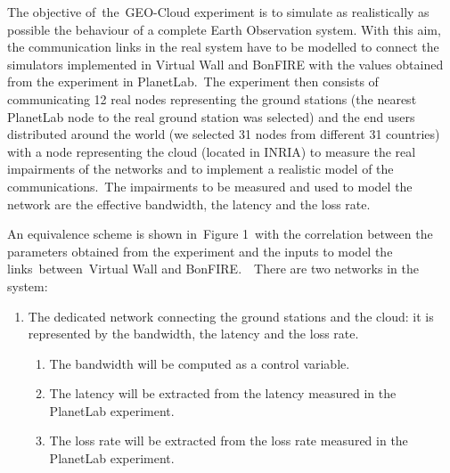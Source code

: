 \documentclass[a4paper]{article}
\newcounter{saveenum}
\newcommand\liststyleLFOvi{%
\renewcommand\theenumi{\roman{enumi}}
\renewcommand\theenumii{\alph{enumii}}
\renewcommand\theenumiii{\roman{enumiii}}
\renewcommand\theenumiv{\arabic{enumiv}}
\renewcommand\labelenumi{\theenumi)}
\renewcommand\labelenumii{\theenumii.}
\renewcommand\labelenumiii{\theenumiii.}
\renewcommand\labelenumiv{\theenumiv.}
}
\begin{document}
The objective of\ the\ GEO-Cloud experiment is to simulate as
realistically as possible the behaviour of a complete Earth Observation
system. With this aim, the communication links in the real system have
to be modelled to connect the simulators implemented in Virtual Wall
and BonFIRE with the values obtained from the experiment in
PlanetLab.\ The experiment then consists of communicating 12 real nodes
representing the ground stations (the nearest PlanetLab node to the
real ground station was selected) and the end users distributed around
the world (we selected 31 nodes from different 31 countries) with a
node representing the cloud (located in INRIA) to measure the real
impairments of the networks and to implement a realistic model of the
communications.\ The impairments to be measured and used to model the
network are the effective bandwidth, the latency and the loss rate.

An equivalence scheme is shown in\ Figure 1\ with the correlation
between the parameters obtained from the experiment and the inputs to
model the links\ between\ Virtual Wall and BonFIRE.\ \ There are two
networks in the system:\ 

\liststyleLFOvi
\setcounter{saveenum}{\value{enumi}}
\begin{enumerate}
\setcounter{enumi}{\value{saveenum}}
\item The dedicated network connecting the ground stations and the
cloud: it is represented by the bandwidth, the latency and the loss
rate.\ 

\setcounter{saveenum}{\value{enumii}}
\begin{enumerate}
\setcounter{enumii}{\value{saveenum}}
\item The bandwidth will be computed as a control variable.
\item The latency will be extracted from the latency measured in the
PlanetLab experiment.
\item The loss rate will be extracted from the loss rate measured in the
PlanetLab experiment.
\end{enumerate}
\end{enumerate}

\bigskip
\end{document}
